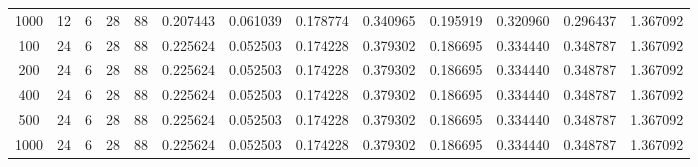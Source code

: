 \begin{table}[h]
\begin{tabular}{ccccccccccccc}
1000 & 12 & 6 & 28 & 88 & 0.207443 & 0.061039 & 0.178774 & 0.340965 & 0.195919 & 0.320960 & 0.296437 & 1.367092 \\
100 & 24 & 6 & 28 & 88 & 0.225624 & 0.052503 & 0.174228 & 0.379302 & 0.186695 & 0.334440 & 0.348787 & 1.367092 \\
200 & 24 & 6 & 28 & 88 & 0.225624 & 0.052503 & 0.174228 & 0.379302 & 0.186695 & 0.334440 & 0.348787 & 1.367092 \\
400 & 24 & 6 & 28 & 88 & 0.225624 & 0.052503 & 0.174228 & 0.379302 & 0.186695 & 0.334440 & 0.348787 & 1.367092 \\
500 & 24 & 6 & 28 & 88 & 0.225624 & 0.052503 & 0.174228 & 0.379302 & 0.186695 & 0.334440 & 0.348787 & 1.367092 \\
1000 & 24 & 6 & 28 & 88 & 0.225624 & 0.052503 & 0.174228 & 0.379302 & 0.186695 & 0.334440 & 0.348787 & 1.367092 \\
\bottomrule
\end{tabular}
\end{table}
